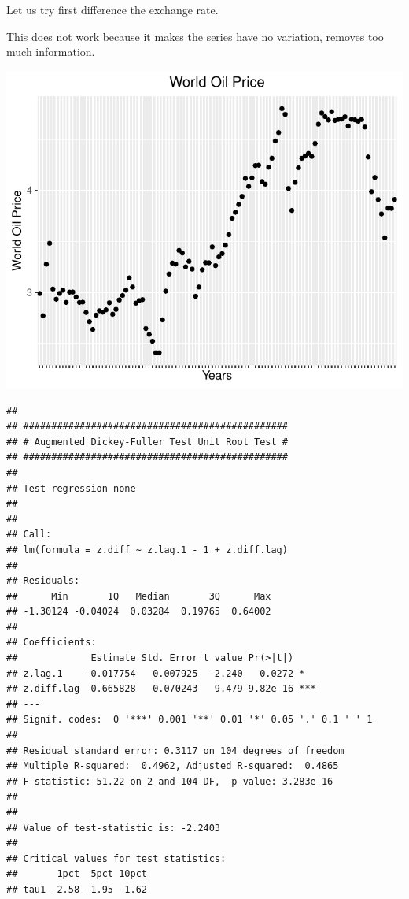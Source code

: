 \documentclass[11pt,preprint, authoryear]{elsarticle}
\numberwithin{equation}{section}
\numberwithin{figure}{section}
\numberwithin{table}{section}
\begin{document}
Let us try first difference the exchange rate.

This does not work because it makes the series have no variation,
removes too much information.

\begin{center}\includegraphics{README_files/figure-latex/unnamed-chunk-22-1} \end{center}

\begin{verbatim}
## 
## ############################################### 
## # Augmented Dickey-Fuller Test Unit Root Test # 
## ############################################### 
## 
## Test regression none 
## 
## 
## Call:
## lm(formula = z.diff ~ z.lag.1 - 1 + z.diff.lag)
## 
## Residuals:
##      Min       1Q   Median       3Q      Max 
## -1.30124 -0.04024  0.03284  0.19765  0.64002 
## 
## Coefficients:
##             Estimate Std. Error t value Pr(>|t|)    
## z.lag.1    -0.017754   0.007925  -2.240   0.0272 *  
## z.diff.lag  0.665828   0.070243   9.479 9.82e-16 ***
## ---
## Signif. codes:  0 '***' 0.001 '**' 0.01 '*' 0.05 '.' 0.1 ' ' 1
## 
## Residual standard error: 0.3117 on 104 degrees of freedom
## Multiple R-squared:  0.4962, Adjusted R-squared:  0.4865 
## F-statistic: 51.22 on 2 and 104 DF,  p-value: 3.283e-16
## 
## 
## Value of test-statistic is: -2.2403 
## 
## Critical values for test statistics: 
##       1pct  5pct 10pct
## tau1 -2.58 -1.95 -1.62
\end{verbatim}
\end{document}
